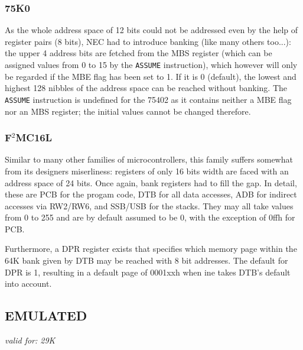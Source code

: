 \documentclass[12pt,twoside]{report}
\newcommand{\tty}[1]{{\tt #1}}
\begin{document}

\subsubsection{75K0}

As the whole address space of 12 bits could not be addressed even by
the help of register pairs (8 bits), NEC had to introduce banking
(like many others too...): the upper 4 address bits are fetched from
the MBS register (which can be assigned values from 0 to 15 by the
\tty{ASSUME} instruction), which however will only be regarded if the MBE
flag has been set to 1.  If it is 0 (default), the lowest and highest
128 nibbles of the address space can be reached without banking.  The
\tty{ASSUME} instruction is undefined for the 75402 as it contains neither
a MBE flag nor an MBS register; the initial values cannot be changed
therefore.


\subsubsection{F$^2$MC16L}

Similar to many other families of microcontrollers, this family suffers
somewhat from its designers miserliness: registers of only 16 bits width
are faced with an address space of 24 bits.  Once again, bank registers
had to fill the gap.  In detail, these are PCB for the progam code, DTB
for all data accesses, ADB for indirect accesses via RW2/RW6, and SSB/USB
for the stacks.  They may all take values from 0 to 255 and are by default 
assumed to be 0, with the exception of 0ffh for PCB.

Furthermore, a DPR register exists that specifies which memory page within
the 64K bank given by DTB may be reached with 8 bit addresses.  The
default for DPR is 1, resulting in a default page of 0001xxh when ine
takes DTB's default into account.


\subsection{EMULATED}

{\em valid for: 29K}
\end{document}
